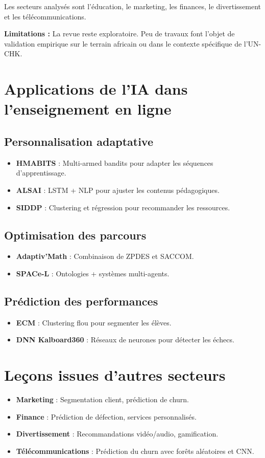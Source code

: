 \documentclass[12pt]{article}
\begin{document}
Les secteurs analysés sont l’éducation, le marketing, les finances, le divertissement et les télécommunications.

\textbf{Limitations :} La revue reste exploratoire. Peu de travaux font l’objet de validation empirique sur le terrain africain ou dans le contexte spécifique de l’UN-CHK.

\section{Applications de l’IA dans l’enseignement en ligne}
\subsection{Personnalisation adaptative}
\begin{itemize}
  \item \textbf{HMABITS} : Multi-armed bandits pour adapter les séquences d’apprentissage.
  \item \textbf{ALSAI} : LSTM + NLP pour ajuster les contenus pédagogiques.
  \item \textbf{SIDDP} : Clustering et régression pour recommander les ressources.
\end{itemize}

\subsection{Optimisation des parcours}
\begin{itemize}
  \item \textbf{Adaptiv'Math} : Combinaison de ZPDES et SACCOM.
  \item \textbf{SPACe-L} : Ontologies + systèmes multi-agents.
\end{itemize}

\subsection{Prédiction des performances}
\begin{itemize}
  \item \textbf{ECM} : Clustering flou pour segmenter les élèves.
  \item \textbf{DNN Kalboard360} : Réseaux de neurones pour détecter les échecs.
\end{itemize}

\section{Leçons issues d'autres secteurs}
\begin{itemize}
  \item \textbf{Marketing} : Segmentation client, prédiction de churn.
  \item \textbf{Finance} : Prédiction de défection, services personnalisés.
  \item \textbf{Divertissement} : Recommandations vidéo/audio, gamification.
  \item \textbf{Télécommunications} : Prédiction du churn avec forêts aléatoires et CNN.
\end{itemize}
\end{document}

